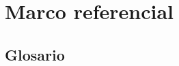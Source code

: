 
\chapter{Marco referencial} %

\label{ch:marcoReferencial} %
\section{Glosario}




\begin{acronym}[API]
\end{acronym}  

\begin{acronym}[Endpoints]
\end{acronym}  

\begin{acronym}
\end{acronym}  

\begin{acronym}[React]
\end{acronym}  

\begin{acronym}[HTTPS]
\end{acronym}  

\begin{acronym}[AES]
\end{acronym}  

\begin{acronym}[Bots]
\end{acronym}  

\begin{acronym}
\end{acronym}  

\begin{acronym}[LibCloud]
\end{acronym}

